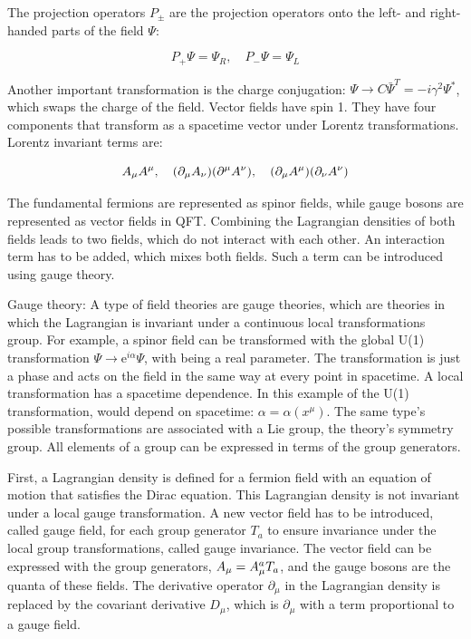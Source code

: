 The projection operators $P_{\pm}$ are the projection operators onto the left- and right-handed parts of the field $\Psi$:

\begin{equation}
  P_{+} \Psi=\Psi_{R}, \quad P_{-} \Psi=\Psi_{L}
\end{equation}

Another important transformation is the charge conjugation: $\Psi \to C \bar{\Psi}^{T}=-i \gamma^2 \Psi^{*}$, which swaps the charge of the field. Vector fields \amu have spin 1. They have four components that transform as a spacetime vector under Lorentz transformations. Lorentz invariant terms are:

\begin{equation}
  A_{\mu} A^{\mu}, \quad (\partial_{\mu} A_{\nu})(\partial^{\mu} A^{\nu}), \quad (\partial_{\mu} A^{\mu})(\partial_{\nu} A^{\nu})
\end{equation}

The fundamental fermions are represented as spinor fields, while gauge bosons are represented as vector fields in QFT. Combining the Lagrangian densities of both fields leads to two fields, which do not interact with each other. An interaction term has to be added, which mixes both fields. Such a term can be introduced using gauge theory.

Gauge theory: A type of field theories are gauge theories, which are theories in which the Lagrangian is invariant under a continuous local transformations group. For example, a spinor field can be transformed with the global U(1) transformation $\Psi \to \mathrm{e}^{i \alpha} \Psi$, with being a real parameter. The transformation is just a phase and acts on the field in the same way at every point in spacetime. A local transformation has a spacetime dependence. In this example of the U(1) transformation, would depend on spacetime: $\alpha=\alpha(x^{\mu})$. The same type's possible transformations are associated with a Lie group, the theory's symmetry group. All elements of a group can be expressed in terms of the group generators.

First, a Lagrangian density is defined for a fermion field with an equation of motion that satisfies the Dirac equation. This Lagrangian density is not invariant under a local gauge transformation. A new vector field \amu has to be introduced, called gauge field, for each group generator $T_{a}$ to ensure invariance under the local group transformations, called gauge invariance. The vector field can be expressed with the group generators, $A_{\mu}=A_{\mu}^{a} T_{a}$, and the gauge bosons are the quanta of these fields. The derivative operator $\partial_{\mu}$ in the Lagrangian density is replaced by the covariant derivative $D_{\mu}$, which is $\partial_{\mu}$ with a term proportional to a gauge field.

